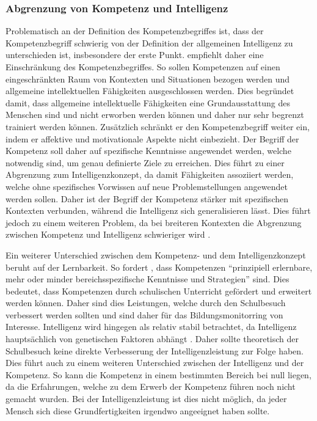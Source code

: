\subsubsection*{Abgrenzung von Kompetenz und Intelligenz}
Problematisch an der Definition des Kompetenzbegriffes ist, dass der Kompetenzbegriff schwierig von der Definition der allgemeinen Intelligenz zu unterschieden ist, insbesondere der erste Punkt. \citet{Weinert2001b} empfiehlt daher eine Einschränkung des Kompetenzbegriffes. So sollen Kompetenzen auf einen eingeschränkten Raum von Kontexten und Situationen bezogen werden und allgemeine intellektuellen Fähigkeiten ausgeschlossen werden. Dies begründet \citet{Weinert2001b} damit, dass allgemeine intellektuelle Fähigkeiten eine Grundausstattung des Menschen sind und nicht erworben werden können und daher nur sehr begrenzt trainiert werden können. Zusätzlich schränkt er den Kompetenzbegriff weiter ein, indem er affektive und motivationale Aspekte nicht einbezieht. Der Begriff der Kompetenz soll daher auf spezifische Kenntnisse angewendet werden, welche notwendig sind, um genau definierte Ziele zu erreichen. Dies führt zu einer Abgrenzung zum Intelligenzkonzept, da damit Fähigkeiten assoziiert werden, welche ohne spezifisches Vorwissen auf neue Problemstellungen angewendet werden sollen. Daher ist der Begriff der Kompetenz stärker mit spezifischen Kontexten verbunden, während die Intelligenz sich generalisieren lässt. Dies führt jedoch zu einem weiteren Problem, da bei breiteren Kontexten die Abgrenzung zwischen Kompetenz und Intelligenz schwieriger wird \citep{Hartig2006}.


Ein weiterer Unterschied zwischen dem Kompetenz- und dem Intelligenzkonzept beruht auf der Lernbarkeit. So fordert \citet[S. 22]{Baumert2001}, dass Kompetenzen "`prinzipiell erlernbare, mehr oder minder bereichsspezifische Kenntnisse und Strategien"' sind. Dies bedeutet, dass Kompetenzen durch schulischen Unterricht gefördert und erweitert werden können. Daher sind dies Leistungen, welche durch den Schulbesuch verbessert werden sollten und sind daher für das Bildungsmonitorring von Interesse. Intelligenz wird hingegen als relativ stabil betrachtet, da Intelligenz hauptsächlich von genetischen Faktoren abhängt \citep{Shakeshaft2013}. Daher sollte theoretisch der Schulbesuch keine direkte Verbesserung der Intelligenzleistung zur Folge haben. Dies führt auch zu einem weiteren Unterschied zwischen der Intelligenz und der Kompetenz. So kann die Kompetenz in einem bestimmten Bereich bei null liegen, da die Erfahrungen, welche zu dem Erwerb der Kompetenz führen noch nicht gemacht wurden. Bei der Intelligenzleistung ist dies nicht möglich, da jeder Mensch sich diese Grundfertigkeiten irgendwo angeeignet haben sollte.


